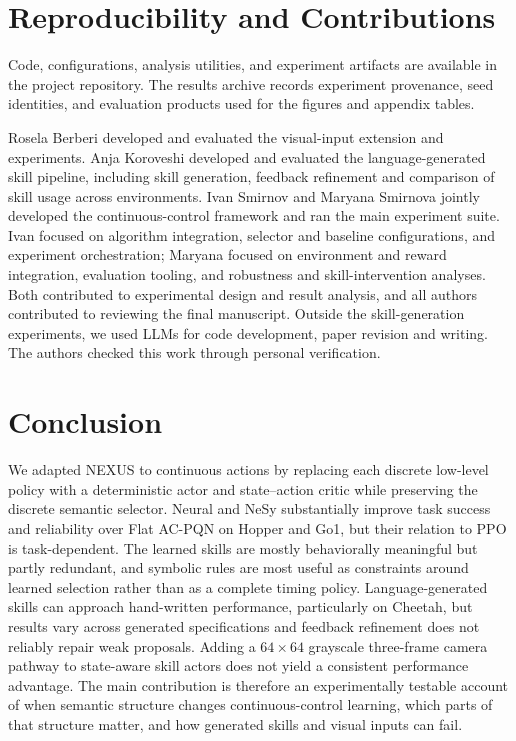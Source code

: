 \documentclass[conference,letterpaper,10pt]{IEEEtran}
\begin{document}
\section{Reproducibility and Contributions}
Code, configurations, analysis utilities, and experiment artifacts are available in the project repository. The results archive records experiment provenance, seed identities, and evaluation products used for the figures and appendix tables.

Rosela Berberi developed and evaluated the visual-input extension and experiments. Anja Koroveshi developed and evaluated the language-generated skill pipeline, including skill generation, feedback refinement and comparison of skill usage across environments. Ivan Smirnov and Maryana Smirnova jointly developed the continuous-control framework and ran the main experiment suite. Ivan focused on algorithm integration, selector and baseline configurations, and experiment orchestration; Maryana focused on environment and reward integration, evaluation tooling, and robustness and skill-intervention analyses. Both contributed to experimental design and result analysis, and all authors contributed to reviewing the final manuscript. Outside the skill-generation experiments, we used LLMs for code development, paper revision and writing. The authors checked this work through personal verification.

\section{Conclusion}
We adapted NEXUS to continuous actions by replacing each discrete low-level policy with a deterministic actor and state--action critic while preserving the discrete semantic selector. Neural and NeSy substantially improve task success and reliability over Flat AC-PQN on Hopper and Go1, but their relation to PPO is task-dependent. The learned skills are mostly behaviorally meaningful but partly redundant, and symbolic rules are most useful as constraints around learned selection rather than as a complete timing policy. Language-generated skills can approach hand-written performance, particularly on Cheetah, but results vary across generated specifications and feedback refinement does not reliably repair weak proposals. Adding a $64\times64$ grayscale three-frame camera pathway to state-aware skill actors does not yield a consistent performance advantage. The main contribution is therefore an experimentally testable account of when semantic structure changes continuous-control learning, which parts of that structure matter, and how generated skills and visual inputs can fail.
\end{document}
